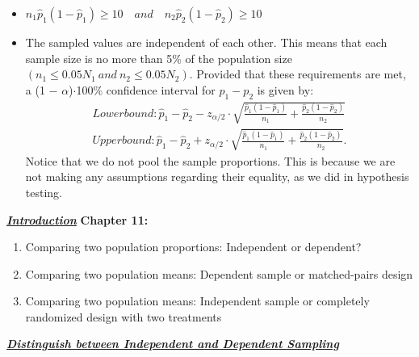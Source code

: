 \documentclass{report}
\begin{document}
\begin{itemize}
\begin{itemize}
            \item  $n_{1}\hat{p}_{1}(1-\hat{p}_{1}) \geq 10 \quad and \quad n_{2}\hat{p}_{2}(1-\hat{p}_{2}) \geq 10 $
            \item  The sampled values are independent of each other. This means that each sample size is no more than 5\% of the population size $(n_{1} \leq0.05N_{1}\ and\ n_{2} \leq 0.05N_{2}).$
                \bigbreak \noindent 
                Provided that these requirements are met, a (1 − $\alpha$)$\cdot  $100\% confidence interval for $p_{1} - p_{2} $ is given by:
                \begin{align*}
                    Lower bound: \hat{p}_1 - \hat{p}_2 - z_{\alpha/2} \cdot \sqrt{\frac{\hat{p}_1(1 - \hat{p}_1)}{n_1} + \frac{\hat{p}_2(1 - \hat{p}_2)}{n_2}} \\
                    Upper bound: \hat{p}_1 - \hat{p}_2 + z_{\alpha/2} \cdot \sqrt{\frac{\hat{p}_1(1 - \hat{p}_1)}{n_1} + \frac{\hat{p}_2(1 - \hat{p}_2)}{n_2}}
                .\end{align*}
                \bigbreak \noindent 
                Notice that we do not pool the sample proportions. This is because we are not making any assumptions regarding their equality, as we did in hypothesis testing.
        \end{itemize}

    \end{itemize}
    \pagebreak \bigbreak \noindent 
    \textbf{\textit{\underline{Introduction}}}
    \bigbreak \noindent 
    \textbf{Chapter 11:}
    \begin{enumerate}
        \item Comparing two population proportions: Independent or dependent?
        \item Comparing two population means: Dependent sample or matched-pairs design
        \item Comparing two population means: Independent sample or completely randomized design with two treatments
    \end{enumerate}
    \bigbreak \noindent \bigbreak \noindent 
    \textbf{\textit{\underline{Distinguish between Independent and Dependent Sampling}}}
    \bigbreak \noindent 
\end{document}
